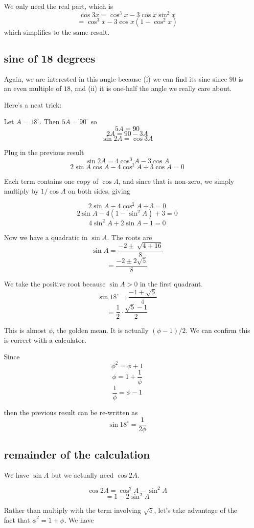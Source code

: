 \documentclass[11pt, oneside]{article}
\begin{document}
We only need the real part, which is
\[ \cos 3x = \cos^3 x - 3 \cos x \sin^2 x \]
\[ = \cos^3 x - 3 \cos x (1 - \cos^2 x) \]
which simplifies to the same result.

\subsection*{sine of 18 degrees}

Again, we are interested in this angle because (i) we can find its sine since $90$ is an even multiple of $18$, and (ii) it is one-half the angle we really care about.

Here's a neat trick:

Let $A = 18^{\circ}$.  Then $5A = 90^{\circ}$ so 
\[ 5A = 90 \]
\[ 2A = 90 - 3A \]
\[ \sin 2A = \cos 3A \]

Plug in the previous result
\[ \sin 2A =  4 \cos^3 A - 3 \cos A \]
\[ 2 \sin A \cos A - 4 \cos^3 A + 3 \cos A = 0 \]

Each term contains one copy of $\cos A$, and since that is non-zero, we simply multiply by $1/\cos A$ on both sides, giving

\[ 2 \sin A - 4 \cos^2 A + 3 = 0 \]
\[ 2 \sin A - 4 (1 - \sin^2 A) + 3 = 0 \]
\[ 4 \sin^2A + 2 \sin A - 1 = 0 \]

Now we have a quadratic in $\sin A$.  The roots are
\[ \sin A = \frac{-2 \pm \ \sqrt{4 + 16}}{8} \]
\[ = \frac{-2 \pm 2 \sqrt{5}}{8} \]

We take the positive root because $\sin A > 0$ in the first quadrant.
\[ \sin 18^{\circ} = \frac{-1 + \sqrt{5}}{4} \]
\[ = \frac{1}{2} \cdot \frac{\sqrt{5} - 1}{2} \]

This is almost $\phi$, the golden mean.  It is actually $(\phi - 1)/2$.  We can confirm this is correct with a calculator.

Since
\[ \phi^2 = \phi + 1 \]
\[ \phi = 1 + \frac{1}{\phi} \]
\[ \frac{1}{\phi} = \phi - 1 \]

then the previous result can be re-written as
\[ \sin 18^{\circ} =  \frac{1}{2 \phi} \]

\subsection*{remainder of the calculation}

We have $\sin A$ but we actually need $\cos 2A$.

\[ \cos 2A = \cos^2 A - \sin^2 A \]
\[ = 1 - 2 \sin^2 A \]

Rather than multiply with the term involving $\sqrt{5}$, let's take advantage of the fact that $\phi^2 = 1 + \phi$.  We have
\end{document}
